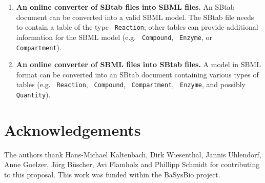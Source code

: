 \documentclass[a4paper]{article}
\newcommand{\tab}[1]{{\texttt{\color{red} #1}}}
\begin{document}
\begin{enumerate}
\item \textbf{An online converter of SBtab files into SBML files.}  An
  SBtab document can be converted into a valid SBML model.  The SBtab
  file needs to contain a table of the type \tab{Reaction}; other tables
  can provide additional information for the SBML model (e.g.
  \tab{Compound}, \tab{Enzyme}, or \tab{Compartment}).
\item \textbf{An online converter of SBML files into SBtab files.} A
  model in SBML format can be converted into an SBtab document
  containing various types of tables (e.g. \tab{Reaction}, \tab{Compound},
  \tab{Compartment}, \tab{Enzyme}, and possibly \tab{Quantity}).
\end{enumerate}


\section*{Acknowledgements}
The authors thank Hans-Michael Kaltenbach, Dirk Wiesenthal, Jannis
Uhlendorf, Anne Goelzer, J\"org B\"uscher, Avi Flamholz and Phillipp Schmidt for
contributing to this proposal. This work was funded within the
BaSysBio project.




\clearpage
\end{document}
